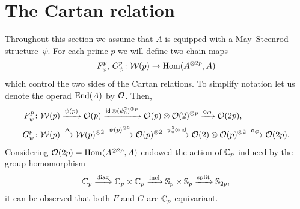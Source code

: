 
\section{The Cartan relation}\label{s:cartan}

Throughout this section we assume that $A$ is equipped with a May--Steenrod structure~$\psi$.
For each prime $p$ we will define two chain maps
\[
F_\psi^p,\, G_\psi^p \colon \mathcal{W}(p) \to \mathrm{Hom}(A^{\otimes 2p}, A)
\]
which control the two sides of the Cartan relations.
To simplify notation let us denote the operad $\mathrm{End}(A)$ by $\mathcal{O}$.
Then,
\begin{align*}
	F_\psi^p \colon& \mathcal{W}(p) \xrightarrow{\psi(p)} \mathcal{O}(p) \xrightarrow{\mathsf{id}\, \otimes (\psi_0^2)^{\otimes p}}
	\mathcal{O}(p) \otimes \mathcal{O}(2)^{\otimes p} \xrightarrow{\bm{\circ}_{\mathcal{O}}}
	\mathcal{O}(2p), \\
	G_\psi^p \colon& \mathcal{W}(p) \xrightarrow{\Delta}
	\mathcal{W}(p)^{\otimes 2} \xrightarrow{\psi(p)^{\otimes 2}}
	\mathcal{O}(p)^{\otimes 2} \xrightarrow{\psi_0^2 \otimes\, \mathsf{id}}
	\mathcal{O}(2) \otimes \mathcal{O}(p)^{\otimes 2} \xrightarrow{\bm{\circ}_{\mathcal{O}}}
	\mathcal{O}(2p).
\end{align*}
Considering $\mathcal{O}(2p) = \mathrm{Hom}(A^{\otimes 2p}, A)$ endowed the action of $\mathbb{C}_p$ induced by the group homomorphism
\[
\mathbb{C}_p \xrightarrow{\mathrm{diag}} \mathbb{C}_p \times \mathbb{C}_p \xrightarrow{\mathrm{incl}} \mathbb{S}_p \times \mathbb{S}_p \xrightarrow{\mathrm{split}} \mathbb{S}_{2p},
\]
it can be observed that both $F$ and $G$ are $\mathbb{C}_p$-equivariant.

